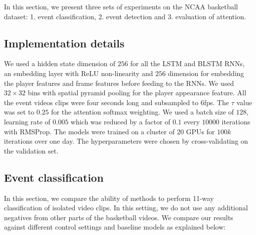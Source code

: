 In this section, we present three sets of experiments on the NCAA basketball
dataset: 1. event classification, 2. event detection and 3. evaluation of
attention.

\subsection{Implementation details}

We used a hidden state dimension of $256$ for all the LSTM and BLSTM RNNs, an
embedding layer with ReLU non-linearity and $256$ dimension for embedding the
player features and frame features before feeding to the RNNs.  We used $32
\times 32$ bins with spatial pyramid pooling for the player appearance feature.
All the event videos clips were four seconds long and subsampled to 6fps.  The
$\tau$ value was set to $0.25$ for the attention softmax weighting. We used a
batch size of $128$, learning rate of $0.005$ which was reduced by a factor of
$0.1$ every $10000$ iterations with RMSProp\cite{RMSProp}. The models were
trained on a cluster of $20$ GPUs for $100k$ iterations over one day.  The
hyperparameters were chosen by cross-validating on the validation set.

\subsection{Event classification}

In this section, we compare the ability of methods to perform 11-way classification of isolated video clips.
In this setting, we do not use any
additional negatives from other parts of the basketball videos.
We compare our results
against different control settings and baseline models as explained
below:

